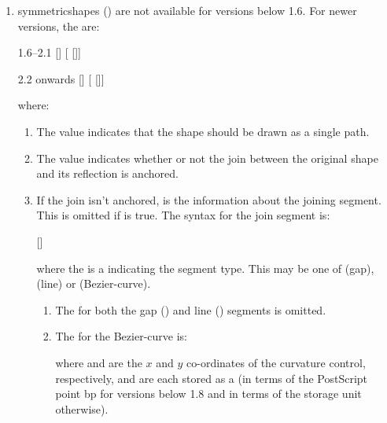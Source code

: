 \begin{numbered}
\begin{enumerate}
  \item\label{jdr:symmetric}%
  \Glspl{symmetricshape} () are not available for versions
  below 1.6. For newer versions, the  are:
  \begin{syntaxline}
\begin{jdrversion}{1.6--2.1}
   []
     
   [ []]
\end{jdrversion}
\begin{jdrversion}{2.2 onwards}
   []
     
   [ []]
\end{jdrversion}
  \end{syntaxline}
  where:
  \begin{enumerate}
  \item The  value  indicates that the 
  shape should be drawn as a single path.

  \item The  value  indicates
   whether or not the join between the original shape and its
   reflection is anchored.

  \item\label{jdr:joinsegment}%
  If the join isn't anchored,  is the
  information about the joining segment. This is omitted if
   is true. The syntax for the join segment is:
  \begin{syntaxline}
   []
  \end{syntaxline}
  where the  is a  indicating the
  segment type. This may be one of  (gap), 
  (line) or  (\gls{Bezier-curve}).
    \begin{enumerate}
    \item The  for both the gap () and
    line () segments is omitted.

    \item The  for the \gls{Bezier-curve} is:
    \begin{syntaxline}
     
    \end{syntaxline}
    where  and  are the $x$ and
    $y$ \glspl{co-ordinate} of the curvature
    control, respectively, and are each stored as a 
    (in terms of the PostScript point \gls{bp} for versions below
    1.8 and in terms of the storage unit otherwise).


\end{enumerate}
\end{enumerate}
\end{enumerate}
\end{numbered}
